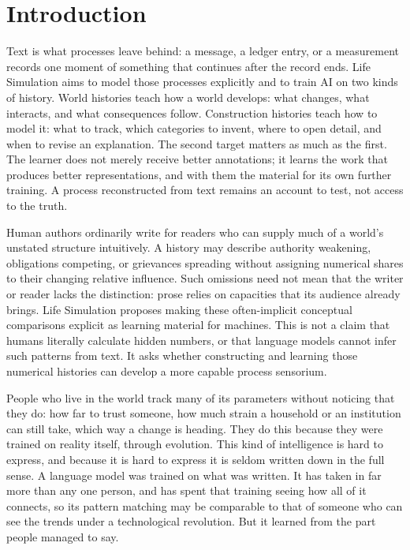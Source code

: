 \documentclass[10pt]{article}
\begin{document}

\ewfrontmatterend

\section{Introduction}
\label{sec:introduction}

Text is what processes leave behind: a message, a ledger entry, or a measurement
records one moment of something that continues after the record ends. Life
Simulation aims to model those processes explicitly and to train AI on two
kinds of history. World histories teach how a world develops: what changes,
what interacts, and what consequences follow. Construction histories teach
how to model it: what to track, which categories to invent, where to open
detail, and when to revise an explanation. The second target matters as much
as the first. The learner does not merely receive better annotations; it
learns the work that produces better representations, and with them the
material for its own further training. A process reconstructed from text
remains an account to test, not access to the truth.

Human authors ordinarily write for readers who can supply much of a world's
unstated structure intuitively. A history may describe authority weakening,
obligations competing, or grievances spreading without assigning numerical
shares to their changing relative influence. Such omissions need not mean
that the writer or reader lacks the distinction: prose relies on capacities
that its audience already brings. Life Simulation proposes making these
often-implicit conceptual comparisons explicit as learning
material for machines. This is not a claim that humans literally calculate
hidden numbers, or that language models cannot infer such patterns from text.
It asks whether constructing and learning those numerical histories can
develop a more capable process sensorium.

People who live in the world track many of its parameters without noticing that they
do: how far to trust someone, how much strain a household or an institution can still
take, which way a change is heading. They do this because they were trained on reality
itself, through evolution. This kind of intelligence is hard to express, and because
it is hard to express it is seldom written down in the full sense. A language model
was trained on what was written. It has taken in far more than any one person, and has
spent that training seeing how all of it connects, so its pattern matching may be
comparable to that of someone who can see the trends under a technological revolution.
But it learned from the part people managed to say.
\end{document}
